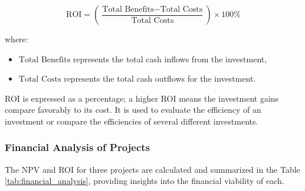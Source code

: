 \[
\text{ROI} = \left(\frac{\text{Total Benefits} - \text{Total Costs}}{\text{Total Costs}}\right) \times 100\%
\]

where:
\begin{itemize}
    \item \(\text{Total Benefits}\) represents the total cash inflows from the investment,
    \item \(\text{Total Costs}\) represents the total cash outflows for the investment.
\end{itemize}

ROI is expressed as a percentage; a higher ROI means the investment gains compare favorably to its cost. It is used to evaluate the efficiency of an investment or compare the efficiencies of several different investments.

\subsubsection*{Financial Analysis of Projects}
The NPV and ROI for three projects are calculated and summarized in the Table \ref{tab:financial_analysis}, providing insights into the financial viability of each.

